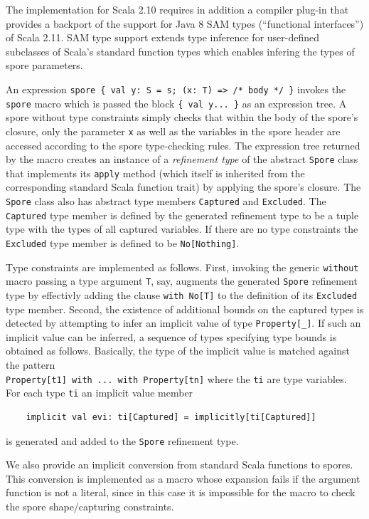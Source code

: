 \documentclass{llncs}
\begin{document}
The implementation for Scala 2.10 requires in addition a compiler plug-in that provides a backport of the support for Java 8 SAM types (``functional interfaces'') of Scala 2.11. SAM type support extends type inference for user-defined subclasses of Scala's standard function types which enables infering the types of spore parameters.

An expression \verb|spore { val y: S = s; (x: T) => /* body */ }| invokes the \verb|spore| macro which is passed the block \verb|{ val y... }| as an expression tree. A spore without type constraints simply checks that within the body of the spore's closure, only the parameter \verb|x| as well as the variables in the spore header are accessed according to the spore type-checking rules. The expression tree returned by the macro creates an instance of a {\em refinement type} of the abstract \verb|Spore| class that implements its \verb|apply| method (which itself is inherited from the corresponding standard Scala function trait) by applying the spore's closure. The \verb|Spore| class also has abstract type members \verb|Captured| and \verb|Excluded|. The \verb|Captured| type member is defined by the generated refinement type to be a tuple type with the types of all captured variables. If there are no type constraints the \verb|Excluded| type member is defined to be \verb|No[Nothing]|.

Type constraints are implemented as follows. First, invoking the generic \verb|without| macro passing a type argument \verb|T|, say, augments the generated \verb|Spore| refinement type by effectivly adding the clause \verb|with No[T]| to the definition of its \verb|Excluded| type member. Second, the existence of additional bounds on the captured types is detected by attempting to infer an implicit value of type \verb|Property[_]|. If such an implicit value can be inferred, a sequence of types specifying type bounds is obtained as follows. Basically, the type of the implicit value is matched against the pattern \\ \verb|Property[t1] with ... with Property[tn]| where the \verb|ti| are type variables. For each type \verb|ti| an implicit value member

\begin{lstlisting}
    implicit val evi: ti[Captured] = implicitly[ti[Captured]]
\end{lstlisting}
\noindent
is generated and added to the \verb|Spore| refinement type.

We also provide an implicit conversion from standard Scala functions to spores. This conversion is implemented as a macro whose expansion fails if the argument function is not a literal, since in this case it is impossible for the macro to check the spore shape/capturing constraints.
\end{document}
